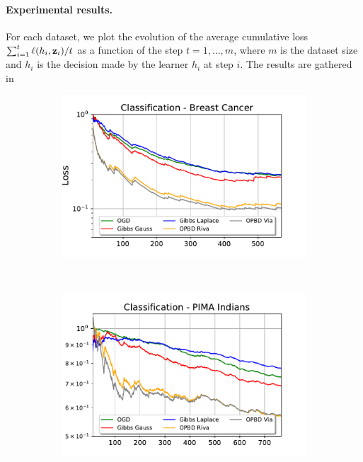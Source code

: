  \paragraph{Experimental results.}
 For each dataset, we plot the evolution of the average cumulative loss $\sum_{i=1}^{t} \ell(h_{i},\mathbf{z}_i) / t$ as a function of the step $t=1, \ldots, m$, where $m$ is the dataset size and $h_{i}$ is the decision made by the learner $h_i$ at step $i$. The results are gathered in 

 \begin{figure}
   \centering
   \begin{subfigure}[b]{0.45\textwidth}
     \centering
     \includegraphics[width=\textwidth]{chapter_3/figures/class_breast.pdf}
  \end{subfigure}~
  \begin{subfigure}[b]{0.45\textwidth}
    \centering
    \includegraphics[width=\textwidth]{chapter_3/figures/class_diabetes}

\end{subfigure}
\end{figure}
